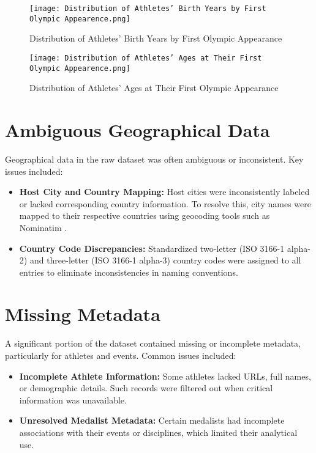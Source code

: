 \begin{figure}[ht]
    \centering
    \texttt{[image: Distribution of Athletes' Birth Years by First Olympic Appearence.png]}
    \caption{Distribution of Athletes' Birth Years by First Olympic Appearance}
    \label{fig:birth_years}
\end{figure}

\begin{figure}[ht]
    \centering
    \texttt{[image: Distribution of Athletes' Ages at Their First Olympic Appearence.png]}
    \caption{Distribution of Athletes' Ages at Their First Olympic Appearance}
    \label{fig:athlete_ages}
\end{figure}

\section{Ambiguous Geographical Data}

Geographical data in the raw dataset was often ambiguous or inconsistent. Key issues included:

\begin{itemize}
    \item \textbf{Host City and Country Mapping:} Host cities were inconsistently labeled or lacked corresponding country information. To resolve this, city names were mapped to their respective countries using geocoding tools such as Nominatim \cite{nominatim}.
    \item \textbf{Country Code Discrepancies:} Standardized two-letter (ISO 3166-1 alpha-2) and three-letter (ISO 3166-1 alpha-3) country codes were assigned to all entries to eliminate inconsistencies in naming conventions.
\end{itemize}



\section{Missing Metadata}

A significant portion of the dataset contained missing or incomplete metadata, particularly for athletes and events. Common issues included:

\begin{itemize}
    \item \textbf{Incomplete Athlete Information:} Some athletes lacked URLs, full names, or demographic details. Such records were filtered out when critical information was unavailable.
    \item \textbf{Unresolved Medalist Metadata:} Certain medalists had incomplete associations with their events or disciplines, which limited their analytical use.
\end{itemize}
